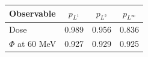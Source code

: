 \begin{tabular}{lccc}
\toprule
Observable & $p_{L^1}$ & $p_{L^2}$ & $p_{L^\infty}$ \\
\midrule
Dose & 0.989 & 0.956 & 0.836 \\
$\Phi$ at 60 MeV & 0.927 & 0.929 & 0.925 \\
\bottomrule
\end{tabular}
